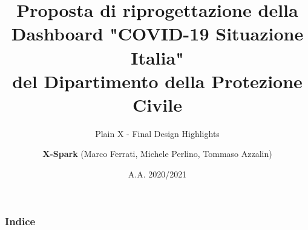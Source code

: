 





\title[Inf UFG]{Proposta di riprogettazione della\\
Dashboard "COVID-19 Situazione Italia"\\
del Dipartimento della Protezione Civile}
\subtitle{Plain X - Final Design Highlights}

\author{\textbf{X-Spark} (Marco Ferrati, Michele Perlino, Tommaso Azzalin)}

\date{A.A. 2020/2021}
\frame[noframenumbering]{\titlepage}

\linespread{1.15}

\begin{frame}
    \frametitle{Indice}
    {
        \hypersetup{linkcolor=black}
        \tableofcontents
    }
\end{frame}








